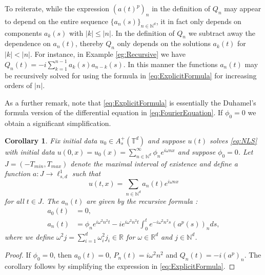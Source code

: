 \documentclass{article}
\newtheorem{corollary}[theorem]{Corollary}
\newcommand{\R}{\mathbb{R}}
\newcommand{\N}{\mathbb{N}}
\newcommand{\T}{\mathbb{T}}
\begin{document}
To reiterate, while the expression $(a(t)^p)_n$ in the definition of $Q_n$ may appear to depend on the entire sequence $\{ a_n(s)\}_{n \in \N^d} $, it in fact only depends on components $a_k(s)$ with $ | k | \leq |n|$.
In the definition of $Q_n$ we subtract away the dependence on $a_n(t)$, thereby $Q_n$ only depends on the solutions  $a_k(t)$ for $ |k| < |n|$. 
For instance, in Example \ref{eg:Recursive} we  have  $ Q_n(t) = -i  \sum_{k=1}^{n-1} a_{k}(s) a_{n-k}(s)$.
In this manner the functions $a_n(t)$ may be recursively solved for using the formula in \eqref{eq:ExplicitFormula} for increasing orders of $|n|$. 

As a further remark, note that 	\eqref{eq:ExplicitFormula} is essentially  the Duhamel's formula version of the differential equation in \eqref{eq:FourierEquation}. 
If  $\phi_0 = 0$ we obtain a significant simplification.
\begin{corollary}\label{thm:ExplicitSolution}
		Fix initial data $ u_0 \in A_s^+(\T^d)$ and suppose $u(t)$ solves \eqref{eq:NLS}  with initial data $ u(0,x) = u_0(x)= \sum_{n \in \N^d}^{\infty}  \phi_n e^{ i \omega n x}$ and suppose  $ \phi_0=0$. 
	Let $ J = (-T_{min},T_{max})$ denote the maximal interval of existence and define  a function $ a: J \to \ell_{s,d}^1$ such that
	\[
	u(t,x) = \sum_{n\in \N^d} a_n(t) e^{i \omega n x}
	\]
	for all $ t \in J$. 
	The $a_n(t)$ are given by the recursive formula : 
	\begin{align} \label{eq:Bdef}
	a_0(t) &= 0,\\
	a_n(t) &= \phi_n e^{i \omega^2 n^2 t}  -  i e^{i \omega^2 n^2 t} 
	\int_0^t  e^{-i \omega^2 n^2 s}  \left(
  a^p(s)  
	\right)_n  ds, 
	\label{eq:BdefIndunction}
	\end{align}
where  we define  $ \omega^2 j = \sum_{i=1}^d \omega_i^2 j_i  \in \R$ for $ \omega \in \R^d$ and $ j \in \N^d$.  

\end{corollary}  
\begin{proof}
	If $\phi_0 = 0$, then $a_0(t)=0$, $P_n(t) = i \omega^2 n^2$ and $ Q_n(t) = -i (a^p)_n$.  The corollary follows by simplifying the expression in \eqref{eq:ExplicitFormula}.  
\end{proof}
\end{document}
